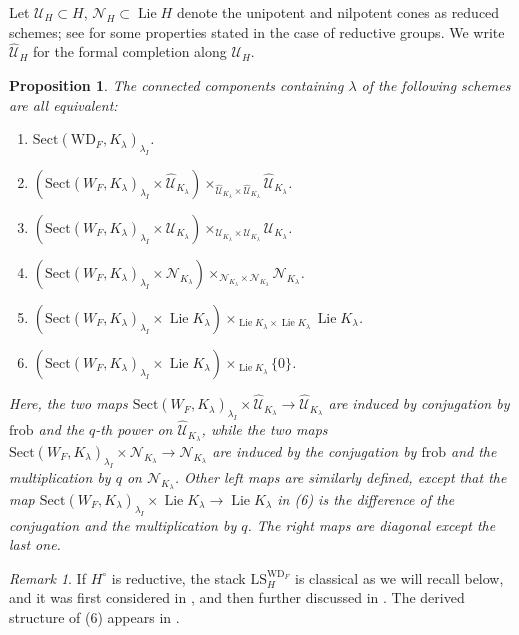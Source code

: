 \documentclass{amsart}
\newtheorem{proposition}[theorem]{Proposition}
\theoremstyle{definition}
\theoremstyle{remark}
\newtheorem{remark}[theorem]{Remark}
\numberwithin{equation}{section}
\DeclareMathOperator{\Lie}{Lie}
\newcommand{\mc}{\mathcal}
\newcommand{\wh}{\widehat}
\newcommand{\frob}{\mathrm{frob}}
\newcommand{\WD}{\mathrm{WD}}
\newcommand{\LS}{\mathrm{LS}}
\newcommand{\Sect}{\mathrm{Sect}}
\begin{document}
Let $\mc U_H \subset H$, $\mc N_H\subset \Lie H$ denote the unipotent and nilpotent cones as reduced schemes; see \cite[\S4.2, \S4.3]{Cotner} for some properties stated in the case of reductive groups. We write $\wh{\mc U}_H$ for the formal completion along $\mc U_H$. 

\begin{proposition}\label{prop: LSDescriptions}
The connected components containing $\lambda$ of the following schemes are all equivalent:
\begin{enumerate}
    \item $\Sect(\WD_F, K_{\lambda})_{\lambda_I}$. 
    \item $(\Sect (W_F, K_{\lambda})_{\lambda_I}\times \wh{\mc U}_{K_{\lambda}})\times_{\wh{\mc U}_{K_{\lambda}}\times \wh{\mc U}_{K_{\lambda}}}\wh{\mc U}_{K_{\lambda}}$. 
    \item $(\Sect(W_F, K_{\lambda})_{\lambda_I} \times \mc U_{K_\lambda} )\times_{\mc U_{K_\lambda}\times \mc U_{K_\lambda}}\mc U_{K_\lambda}$. 
    \item $(\Sect(W_F, K_{\lambda})_{\lambda_I} \times \mc N_{K_\lambda} )\times_{\mc N_{K_\lambda}\times \mc N_{K_\lambda}}\mc N_{K_\lambda}$. 
    \item $(\Sect(W_F, K_{\lambda})_{\lambda_I} \times \Lie K_\lambda)\times_{\Lie K_\lambda\times \Lie K_\lambda}\Lie K_\lambda$. 
    \item $(\Sect(W_F, K_{\lambda})_{\lambda_I} \times \Lie K_\lambda)\times_{\Lie K_\lambda}\{0\}$.
\end{enumerate}
Here, the two maps $\Sect (W_F, K_{\lambda})_{\lambda_I}\times \wh{\mc U}_{K_{\lambda}} \to \wh{\mc U}_{K_{\lambda}}$ are induced by conjugation by $\frob$ and the $q$-th power on $\wh{\mc U}_{K_{\lambda}}$, while the two maps $\Sect(W_F, K_{\lambda})_{\lambda_I} \times \mc N_{K_\lambda} \to \mc N_{K_\lambda}$ are induced by the conjugation by $\frob$ and the multiplication by $q$ on $\mc N_{K_\lambda}$. Other left maps are similarly defined, except that the map $\Sect(W_F, K_{\lambda})_{\lambda_I} \times \Lie K_\lambda\to \Lie K_\lambda$ in (6) is the difference of the conjugation and the multiplication by $q$. The right maps are diagonal except the last one. 
\end{proposition}

\begin{remark}
If $H^\circ$ is reductive, the stack $\LS_H^{\WD_F}$ is classical as we will recall below, and it was first considered in \cite{BellovinGee, BooherPatrikis}, and then further discussed in \cite{DHKM, fargues--scholze, HellmannIwahori, Zhu}. The derived structure of (6) appears in \cite{HellmannIwahori}. 
\end{remark}
\end{document}
